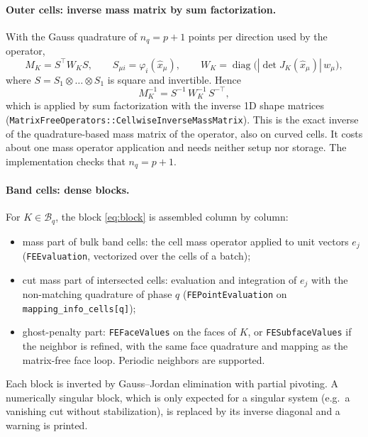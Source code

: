 \documentclass[11pt,a4paper]{article}
\newcommand{\B}{\mathcal{B}}
\newcommand{\code}[1]{\nolinkurl{#1}}
\begin{document}
\paragraph{Outer cells: inverse mass matrix by sum factorization.}
With the Gauss quadrature of $n_q = p+1$ points per direction used by the operator,
\begin{equation}
  M_K = S^\top W_K S,\qquad S_{\mu i} = \varphi_i(\hat x_\mu),\qquad
  W_K = \operatorname{diag}\bigl(|\det J_K(\hat x_\mu)|\,w_\mu\bigr),
\end{equation}
where $S = S_1\otimes\dots\otimes S_1$ is square and invertible. Hence
\begin{equation}
  M_K^{-1} = S^{-1}\,W_K^{-1}\,S^{-\top},
\end{equation}
which is applied by sum factorization with the inverse 1D shape matrices
(\code{MatrixFreeOperators::CellwiseInverseMassMatrix}). This is the exact inverse of the
quadrature-based mass matrix of the operator, also on curved cells. It costs about one mass operator
application and needs neither setup nor storage. The implementation checks that $n_q = p+1$.

\paragraph{Band cells: dense blocks.}
For $K\in\B_q$, the block \eqref{eq:block} is assembled column by column:
\begin{itemize}[leftmargin=*]
  \item mass part of bulk band cells: the cell mass operator applied to unit vectors $e_j$
        (\code{FEEvaluation}, vectorized over the cells of a batch);
  \item cut mass part of intersected cells: evaluation and integration of $e_j$ with the
        non-matching quadrature of phase $q$ (\code{FEPointEvaluation} on
        \code{mapping_info_cells[q]});
  \item ghost-penalty part: \code{FEFaceValues} on the faces of $K$, or \code{FESubfaceValues} if the
        neighbor is refined, with the same face quadrature and mapping as the matrix-free face loop.
        Periodic neighbors are supported.
\end{itemize}
Each block is inverted by Gauss--Jordan elimination with partial pivoting. A numerically singular
block, which is only expected for a singular system (e.g.\ a vanishing cut without stabilization),
is replaced by its inverse diagonal and a warning is printed.
\end{document}
